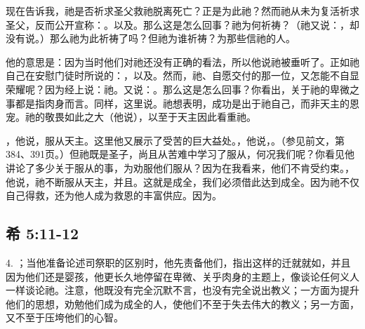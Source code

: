 现在告诉我，祂是否祈求圣父救祂脱离死亡？正是为此祂？然而祂从未为复活祈求圣父，反而公开宣称：。以及。那么这是怎么回事？祂为何祈祷？（祂又说：，却没有说。）那么祂为此祈祷了吗？但祂为谁祈祷？为那些信祂的人。\par

他的意思是：因为当时他们对祂还没有正确的看法，所以他说祂被垂听了。正如祂自己在安慰门徒时所说的：，以及。然而，祂、自愿交付的那一位，又怎能不自显荣耀呢？因为经上说：祂。又说：。那么这是怎么回事？你看出，关于祂的卑微之事都是指肉身而言。同样，这里说。祂想表明，成功是出于祂自己，而非天主的恩宠。祂的敬畏如此之大（他说），以至于天主因此看重祂。\par

，他说，服从天主。这里他又展示了受苦的巨大益处。，他说，。（参见前文，第384、391页。）但祂既是圣子，尚且从苦难中学习了服从，何况我们呢？你看见他讲论了多少关于服从的事，为劝服他们服从？因为在我看来，他们不肯受约束。，他说，祂不断服从天主，并且。这就是成全，我们必须借此达到成全。因为祂不仅自己得救，还为他人成为救恩的丰富供应。因为。\par


\subsection{希 5:11-12}

4. ；当他准备论述司祭职的区别时，他先责备他们，指出这样的迁就就如，并且因为他们还是婴孩，他更长久地停留在卑微、关乎肉身的主题上，像谈论任何义人一样谈论祂。注意，他既没有完全沉默不言，也没有完全说出教义；一方面为提升他们的思想，劝勉他们成为成全的人，使他们不至于失去伟大的教义；另一方面，又不至于压垮他们的心智。\par

